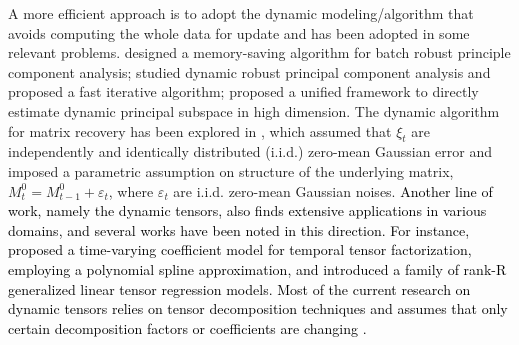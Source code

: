\documentclass[12pt]{article}
\newcommand{\oldchange}[1]{\textcolor{black}{#1}}
\begin{document}
A more efficient approach is to adopt the dynamic modeling/algorithm that avoids computing the whole data for update and has been adopted in some relevant problems. 
\cite{lois2015online} designed a memory-saving algorithm for batch robust principle component analysis; \cite{gao2018dynamic} studied dynamic robust principal component analysis and proposed a fast iterative algorithm; \cite{hu2021dynamic} proposed a unified framework to directly estimate dynamic principal subspace in high dimension. The dynamic algorithm for matrix recovery has been explored in \cite{xu2016dynamic}, which assumed that $\xi_t$ are independently and identically distributed (i.i.d.) zero-mean Gaussian error and imposed a parametric assumption on structure of the underlying matrix, $M_t^0=M_{t-1}^0+\varepsilon_t$, where $\varepsilon_t$ are i.i.d. zero-mean Gaussian noises.
\oldchange{Another line of work, namely the dynamic tensors, also finds extensive applications in various domains, and several works have been noted in this direction. For instance, \cite{zhang2021dynamic} proposed a time-varying coefficient model for temporal tensor factorization, employing a polynomial spline approximation, and \cite{zhou2013tensor} introduced a family of rank-R generalized linear tensor regression models. Most of the current research on dynamic tensors relies on tensor decomposition techniques and assumes that only certain decomposition factors or coefficients are changing \citep{zhang2021dynamic,bi2021tensors,koren2009collaborative,wang2016recommending}.}
  
\end{document}
